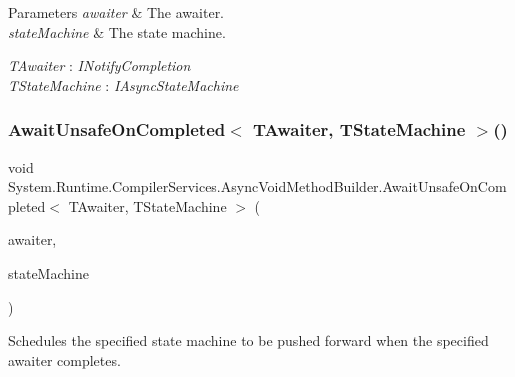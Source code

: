 \begin{DoxyParams}{Parameters}
{\em awaiter} & The awaiter.\\
\hline
{\em state\+Machine} & The state machine.\\
\hline
\end{DoxyParams}
\begin{Desc}
\item[Type Constraints]\begin{description}
\item[{\em T\+Awaiter} : {\em I\+Notify\+Completion}]\item[{\em T\+State\+Machine} : {\em I\+Async\+State\+Machine}]\end{description}
\end{Desc}
\mbox{\label{struct_system_1_1_runtime_1_1_compiler_services_1_1_async_void_method_builder_ae6c510dbdc77b3197b00fed939da2263}} 
\subsubsection{\texorpdfstring{Await\+Unsafe\+On\+Completed$<$ T\+Awaiter, T\+State\+Machine $>$()}{AwaitUnsafeOnCompleted< TAwaiter, TStateMachine >()}}
{\footnotesize\ttfamily void System.\+Runtime.\+Compiler\+Services.\+Async\+Void\+Method\+Builder.\+Await\+Unsafe\+On\+Completed$<$ T\+Awaiter, T\+State\+Machine $>$ (\begin{DoxyParamCaption}\item[{ref T\+Awaiter}]{awaiter,  }\item[{ref T\+State\+Machine}]{state\+Machine }\end{DoxyParamCaption})\hspace{0.3cm}{\ttfamily [inline]}}



Schedules the specified state machine to be pushed forward when the specified awaiter completes. 


